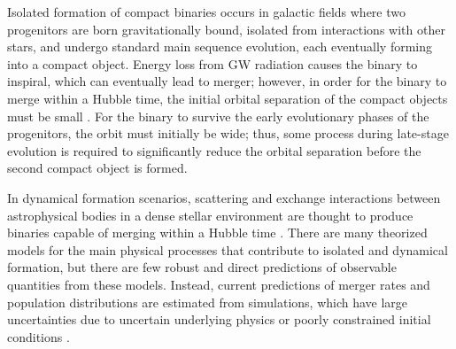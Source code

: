 Isolated formation of compact binaries occurs in galactic fields where two progenitors are born gravitationally bound, isolated from interactions with other stars, and undergo standard main sequence evolution, each eventually forming into a compact object. Energy loss from GW radiation causes the binary to inspiral, which can eventually lead to merger; however, in order for the binary to merge within a Hubble time, the initial orbital separation of the compact objects must be small \citep{10.1051/0004-6361/201936204,10.1007/s41114-021-00034-3}. For the binary to survive the early evolutionary phases of the progenitors, the orbit must initially be wide; thus, some process during late-stage evolution is required to significantly reduce the orbital separation before the second compact object is formed. 

In dynamical formation scenarios, scattering and exchange interactions between astrophysical bodies in a dense stellar environment are thought to produce binaries capable of merging within a Hubble time \citep{1602.02444}. There are many theorized models for the main physical processes that contribute to isolated and dynamical formation, but there are few robust and direct predictions of observable quantities from these models. Instead, current predictions of merger rates and population distributions are estimated from simulations, which have large uncertainties due to uncertain underlying physics or poorly constrained initial conditions \citep{1308.1546, 1806.00001v3, 10.1051/0004-6361/201936204, 10.1007/s41114-021-00034-3}.

